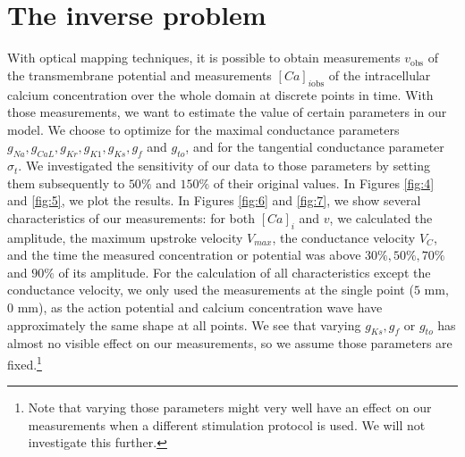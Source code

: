 \documentclass[12pt,a4paper]{article}
\begin{document}
\section{The inverse problem} \label{The inverse problem}
With optical mapping techniques, it is possible to obtain measurements $v_{\text{obs}}$ of the transmembrane potential and measurements $[Ca]_{i\text{obs}}$ of the intracellular calcium concentration over the whole domain at discrete points in time. With those measurements, we want to estimate the value of certain parameters in our model. We choose to optimize for the maximal conductance parameters $g_{Na}, g_{CaL}, g_{Kr}, g_{K1}, g_{Ks}, g_{f}$ and $g_{to}$, and for the tangential conductance parameter $\sigma_t$. We investigated the sensitivity of our data to those parameters by setting them subsequently to $50\%$ and $150\%$ of their original values. In Figures \ref{fig:4} and \ref{fig:5}, we plot the results.
In Figures \ref{fig:6} and \ref{fig:7}, we show several characteristics of our measurements: for both $[Ca]_i$ and $v$, we calculated the amplitude, the maximum upstroke velocity $V_{max}$, the conductance velocity $V_{C}$, and the time the measured concentration or potential was above $30\%, 50\%, 70\%$ and $90\%$ of its amplitude. For the calculation of all characteristics except the conductance velocity, we only used the measurements at the single point ($5$ mm, $0$ mm), as the action potential and calcium concentration wave have approximately the same shape at all points. We see that varying $g_{Ks}, g_{f}$ or $g_{to}$ has almost no visible effect on our measurements, so we assume those parameters are fixed.\footnote{Note that varying those parameters might very well have an effect on our measurements when a different stimulation protocol is used. We will not investigate this further.} 
\end{document}
